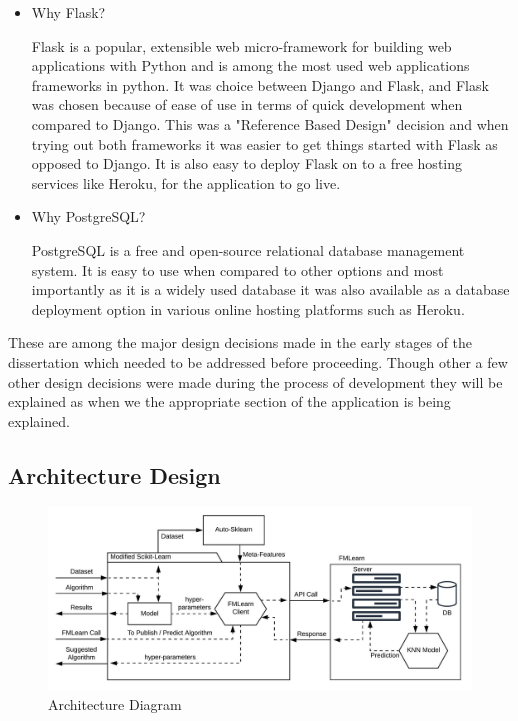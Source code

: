 \begin{itemize}
    \item Why Flask?
    
    Flask is a popular, extensible web micro-framework for building web applications with Python \citep{flask} and is among the most used web applications frameworks in python. It was choice between Django and Flask, and Flask was chosen because of ease of use in terms of quick development when compared to Django. This was a "Reference Based Design" decision and when trying out both frameworks it was easier to get things started with Flask as opposed to Django. It is also easy to deploy Flask on to a free hosting services like Heroku, for the application to go live.
    
    \item Why PostgreSQL?
    
    PostgreSQL is a free and open-source relational database management system. It is easy to use when compared to other options and most importantly as it is a widely used database it was also available as a database deployment option in various online hosting platforms such as Heroku.
    
\end{itemize}

These are among the major design decisions made in the early stages of the dissertation which needed to be addressed before proceeding. Though other a few other design decisions were made during the process of development they will be explained as when we the appropriate section of the application is being explained.

\subsection{Architecture Design}
\label{architecture}



\begin{figure}[t]
    \centering
    \includegraphics[width=15cm]{images/FML Architecture Diagram.jpeg}
    \caption{Architecture Diagram}
    \label{architecture-diagram}
\end{figure}


